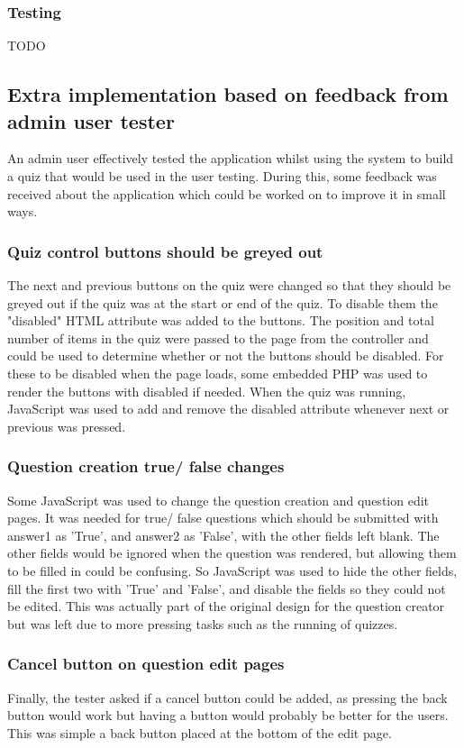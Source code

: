 \subsubsection{Testing}
TODO
\newpage

\subsection{Extra implementation based on feedback from admin user tester}
An admin user effectively tested the application whilst using the system to build a quiz that would be used in the user testing. During this, some feedback was received about the application which could be worked on to improve it in small ways.
\subsubsection{Quiz control buttons should be greyed out}
The next and previous buttons on the quiz were changed so that they should be greyed out if the quiz was at the start or end of the quiz. To disable them the "disabled" HTML attribute was added to the buttons. The position and total number of items in the quiz were passed to the page from the controller and could be used to determine whether or not the buttons should be disabled. For these to be disabled when the page loads, some embedded PHP was used to render the buttons with disabled if needed. When the quiz was running, JavaScript was used to add and remove the disabled attribute whenever next or previous was pressed.
\subsubsection{Question creation true/ false changes}
Some JavaScript was used to change the question creation and question edit pages. It was needed for true/ false questions which should be submitted with answer1 as 'True', and answer2 as 'False', with the other fields left blank. The other fields would be ignored when the question was rendered, but allowing them to be filled in could be confusing. So JavaScript was used to hide the other fields, fill the first two with 'True' and 'False', and disable the fields so they could not be edited. This was actually part of the original design for the question creator but was left due to more pressing tasks such as the running of quizzes.
\subsubsection{Cancel button on question edit pages}
Finally, the tester asked if a cancel button could be added, as pressing the back button would work but having a button would probably be better for the users. This was simple a back button placed at the bottom of the edit page.

